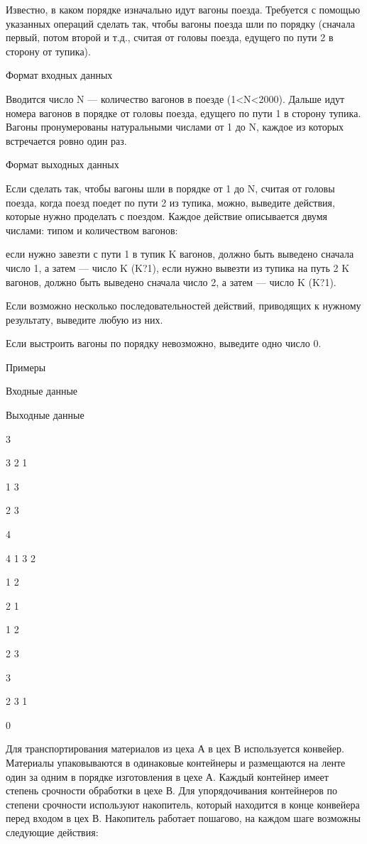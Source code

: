 \documentclass[]{article}
\begin{document}
Известно, в каком порядке изначально идут вагоны поезда. Требуется с помощью указанных операций сделать так, чтобы вагоны поезда шли по порядку (сначала первый, потом второй и т.д., считая от головы поезда, едущего по пути 2 в сторону от тупика).

Формат входных данных

Вводится число N — количество вагонов в поезде (1<N<2000). Дальше идут номера вагонов в порядке от головы поезда, едущего по пути 1 в сторону тупика. Вагоны пронумерованы натуральными числами от 1 до N, каждое из которых встречается ровно один раз.

Формат выходных данных

Если сделать так, чтобы вагоны шли в порядке от 1 до N, считая от головы поезда, когда поезд поедет по пути 2 из тупика, можно, выведите действия, которые нужно проделать с поездом. Каждое действие описывается двумя числами: типом и количеством вагонов:

    если нужно завезти с пути 1 в тупик K вагонов, должно быть выведено сначала число 1, а затем — число K (K?1),
    если нужно вывезти из тупика на путь 2 K вагонов, должно быть выведено сначала число 2, а затем — число K (K?1).

Если возможно несколько последовательностей действий, приводящих к нужному результату, выведите любую из них.

Если выстроить вагоны по порядку невозможно, выведите одно число 0.

Примеры

Входные данные
	

Выходные данные

3

3 2 1
	

1 3

2 3

4

4 1 3 2
	

1 2

2 1

1 2

2 3

3

2 3 1
	

0

Для транспортирования материалов из цеха А в цех В используется конвейер. Материалы упаковываются в одинаковые контейнеры и размещаются на ленте один за одним в порядке изготовления в цехе А. Каждый контейнер имеет степень срочности обработки в цехе В. Для упорядочивания контейнеров по степени срочности используют накопитель, который находится в конце конвейера перед входом в цех В. Накопитель работает пошагово, на каждом шаге возможны следующие действия:
\end{document}
